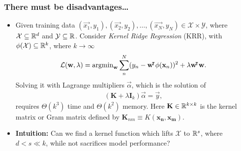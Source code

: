 \documentclass[10pt]{../formats/RU}
\begin{document}
\begin{frame}
  \frametitle{There must be disadvantages\ldots}
  \begin{itemize}
    \item <1-> Given training data $(\vec{x_1}, y_1), (\vec{x_2}, y_2), \ldots, (\vec{x_N}, y_N) \in \mathcal{X}\times\mathcal{Y}$, where $\mathcal{X}\subseteq \mathbb{R}^d$ and $\mathcal{Y}\subseteq\mathbb{R}$. Consider \emph{Kernel Ridge Regression} (KRR), with $\phi(\mathcal{X})\subseteq \mathbb{R}^k$, where $k\rightarrow\infty$
    \begin{align*}
      \mathcal{L}(\mathbf{w}, \lambda)=\operatorname{\mathrm{argmin}}_{\mathbf{w}}\sum_{n}^{N}(y_n - \mathbf{w}{}^{\mkern-4mu\intercal}\phi(\mathbf{x}_n))^2 + \lambda\mathbf{w}{}^{\mkern-4mu\intercal}\mathbf{w}.
    \end{align*}
    Solving it with Lagrange multipliers $\vec{\alpha}$, which is the solution of
    \begin{align*}%
      (\mathbf{K}+\lambda\mathbf{I}_k)\vec{\alpha} = \vec{y},
    \end{align*}
    requires $\Theta(k^3)$ time and $\Theta(k^2)$ memory. Here $\mathbf{K}\in \mathbb{R}^{k\times k}$ is the kernel matrix or Gram matrix defined by $\mathbf{K}_{nm} \equiv K(\mathbf{x_n}, \mathbf{x_m})$.
    \item <2-> \textbf{Intuition:} Can we find a kernel function which lifts $\mathcal{X}$ to $\mathbb{R}^s$, where $d < s\ll k$, while not sacrifices model performance?
  \end{itemize}
\end{frame}
\end{document}
